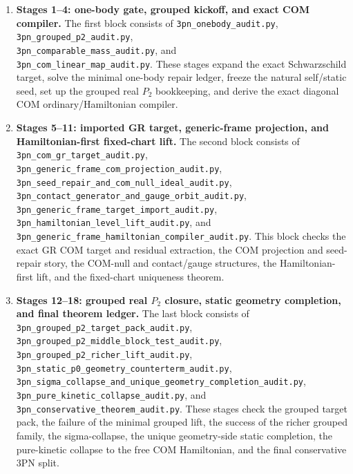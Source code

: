 \documentclass[11pt]{article}
\begin{document}
\begin{enumerate}
  \item \textbf{Stages 1--4: one-body gate, grouped kickoff, and exact COM
  compiler.}  The first block consists of
  \texttt{3pn\_onebody\_audit.py},\\
  \texttt{3pn\_grouped\_p2\_audit.py},\\
  \texttt{3pn\_comparable\_mass\_audit.py}, and\\
  \texttt{3pn\_com\_linear\_map\_audit.py}.  These stages expand the exact
  Schwarzschild target, solve the minimal one-body repair ledger, freeze the
  natural self/static seed, set up the grouped real $P_2$ bookkeeping, and
  derive the exact diagonal COM ordinary/Hamiltonian compiler.

  \item \textbf{Stages 5--11: imported GR target, generic-frame projection, and
  Hamiltonian-first fixed-chart lift.}  The second block consists of
  \texttt{3pn\_com\_gr\_target\_audit.py},\\
  \texttt{3pn\_generic\_frame\_com\_projection\_audit.py},\\
  \texttt{3pn\_seed\_repair\_and\_com\_null\_ideal\_audit.py},\\
  \texttt{3pn\_contact\_generator\_and\_gauge\_orbit\_audit.py},\\
  \texttt{3pn\_generic\_frame\_target\_import\_audit.py},\\
  \texttt{3pn\_hamiltonian\_level\_lift\_audit.py}, and\\
  \texttt{3pn\_generic\_frame\_hamiltonian\_compiler\_audit.py}.  This block
  checks the exact GR COM target and residual extraction, the COM projection and
  seed-repair story, the COM-null and contact/gauge structures, the
  Hamiltonian-first lift, and the fixed-chart uniqueness theorem.

  \item \textbf{Stages 12--18: grouped real $P_2$ closure, static geometry
  completion, and final theorem ledger.}  The last block consists of
  \texttt{3pn\_grouped\_p2\_target\_pack\_audit.py},\\
  \texttt{3pn\_grouped\_p2\_middle\_block\_test\_audit.py},\\
  \texttt{3pn\_grouped\_p2\_richer\_lift\_audit.py},\\
  \texttt{3pn\_static\_p0\_geometry\_counterterm\_audit.py},\\
  \texttt{3pn\_sigma\_collapse\_and\_unique\_geometry\_completion\_audit.py},\\
  \texttt{3pn\_pure\_kinetic\_collapse\_audit.py}, and\\
  \texttt{3pn\_conservative\_theorem\_audit.py}.  These stages check the
  grouped target pack, the failure of the minimal grouped lift, the success of
  the richer grouped family, the sigma-collapse, the unique geometry-side static
  completion, the pure-kinetic collapse to the free COM Hamiltonian, and the
  final conservative $3$PN split.
\end{enumerate}
\end{document}
